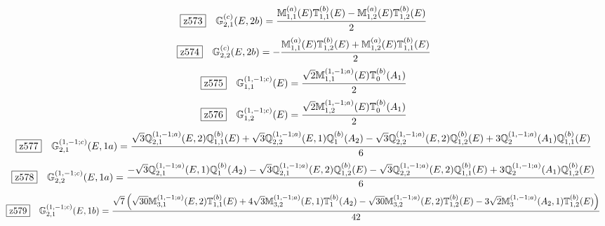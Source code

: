 \documentclass[fleqn,10pt,landscape]{jsarticle}
\begin{document}
\begin{dmath*}
\hspace*{3mm}\fbox{z573}\quad \mathbb{G}_{2,1}^{(c)}(E,2b)=\frac{\mathbb{M}_{1,1}^{(a)}(E) \mathbb{T}_{1,1}^{(b)}(E) - \mathbb{M}_{1,2}^{(a)}(E) \mathbb{T}_{1,2}^{(b)}(E)}{2}
\end{dmath*}
\begin{dmath*}
\hspace*{3mm}\fbox{z574}\quad \mathbb{G}_{2,2}^{(c)}(E,2b)=- \frac{\mathbb{M}_{1,1}^{(a)}(E) \mathbb{T}_{1,2}^{(b)}(E) + \mathbb{M}_{1,2}^{(a)}(E) \mathbb{T}_{1,1}^{(b)}(E)}{2}
\end{dmath*}
\begin{dmath*}
\hspace*{3mm}\fbox{z575}\quad \mathbb{G}_{1,1}^{(1,-1;c)}(E)=\frac{\sqrt{2} \mathbb{M}_{1,1}^{(1,-1;a)}(E) \mathbb{T}_{0}^{(b)}(A_{1})}{2}
\end{dmath*}
\begin{dmath*}
\hspace*{3mm}\fbox{z576}\quad \mathbb{G}_{1,2}^{(1,-1;c)}(E)=\frac{\sqrt{2} \mathbb{M}_{1,2}^{(1,-1;a)}(E) \mathbb{T}_{0}^{(b)}(A_{1})}{2}
\end{dmath*}
\begin{dmath*}
\hspace*{3mm}\fbox{z577}\quad \mathbb{G}_{2,1}^{(1,-1;c)}(E,1a)=\frac{\sqrt{3} \mathbb{Q}_{2,1}^{(1,-1;a)}(E,2) \mathbb{Q}_{1,1}^{(b)}(E) + \sqrt{3} \mathbb{Q}_{2,2}^{(1,-1;a)}(E,1) \mathbb{Q}_{1}^{(b)}(A_{2}) - \sqrt{3} \mathbb{Q}_{2,2}^{(1,-1;a)}(E,2) \mathbb{Q}_{1,2}^{(b)}(E) + 3 \mathbb{Q}_{2}^{(1,-1;a)}(A_{1}) \mathbb{Q}_{1,1}^{(b)}(E)}{6}
\end{dmath*}
\begin{dmath*}
\hspace*{3mm}\fbox{z578}\quad \mathbb{G}_{2,2}^{(1,-1;c)}(E,1a)=\frac{- \sqrt{3} \mathbb{Q}_{2,1}^{(1,-1;a)}(E,1) \mathbb{Q}_{1}^{(b)}(A_{2}) - \sqrt{3} \mathbb{Q}_{2,1}^{(1,-1;a)}(E,2) \mathbb{Q}_{1,2}^{(b)}(E) - \sqrt{3} \mathbb{Q}_{2,2}^{(1,-1;a)}(E,2) \mathbb{Q}_{1,1}^{(b)}(E) + 3 \mathbb{Q}_{2}^{(1,-1;a)}(A_{1}) \mathbb{Q}_{1,2}^{(b)}(E)}{6}
\end{dmath*}
\begin{dmath*}
\hspace*{3mm}\fbox{z579}\quad \mathbb{G}_{2,1}^{(1,-1;c)}(E,1b)=\frac{\sqrt{7} \left(\sqrt{30} \mathbb{M}_{3,1}^{(1,-1;a)}(E,2) \mathbb{T}_{1,1}^{(b)}(E) + 4 \sqrt{3} \mathbb{M}_{3,2}^{(1,-1;a)}(E,1) \mathbb{T}_{1}^{(b)}(A_{2}) - \sqrt{30} \mathbb{M}_{3,2}^{(1,-1;a)}(E,2) \mathbb{T}_{1,2}^{(b)}(E) - 3 \sqrt{2} \mathbb{M}_{3}^{(1,-1;a)}(A_{2},1) \mathbb{T}_{1,2}^{(b)}(E)\right)}{42}
\end{dmath*}
\end{document}
